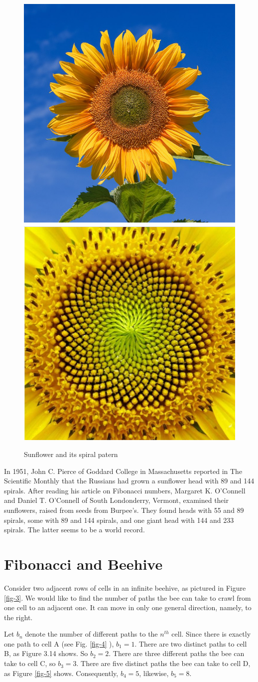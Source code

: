 \documentclass[10pt]{report}
\begin{document}
{\begin{figure}[h!]
	\centering
	\includegraphics[height=45 mm, width=0.45 \textwidth ]{sunflower.png}
	\includegraphics[height=4.5 cm, width=0.45 \textwidth ]{sunflower1.png}
	\caption{Sunflower and its spiral patern}
	\label{fig-2}
\end{figure}
In 1951, John C. Pierce of Goddard College in Massachusetts reported in The
Scientific Monthly that the Russians had grown a sunflower head with 89 and 144 spirals. After reading his article on Fibonacci numbers, Margaret K. O'Connell and Daniel T. O'Connell of South Londonderry, Vermont, examined their sunflowers, raised from seeds from Burpee's. They found heads with 55 and 89 spirals, some with 89 and 144 spirals, and one giant head with 144 and 233 spirals. The latter seems to be a world record.

 

\section{Fibonacci  and Beehive}
Consider two adjacent rows of cells in an infinite beehive, as pictured in Figure \ref{fig-3}. We would like to find the number of paths the bee can take to crawl from one cell to  an adjacent one. It can move in only one general direction, namely, to the right.

Let $b_n$ denote the number of different paths to the $n^{th}$ cell. Since there is exactly one path to cell A (see Fig. \ref{fig-4} ), $b_1 =1$. There are two distinct paths to cell B, as Figure 3.14 shows. So $b_2= 2$. There are three different paths the bee can take to cell  C, so $b_3  = 3$. There are five distinct paths the bee can take to cell D,  as Figure \ref{fig-5} shows. Consequently, $b_4 = 5$, likewise,  $b_5= 8$.

}
\end{document}
